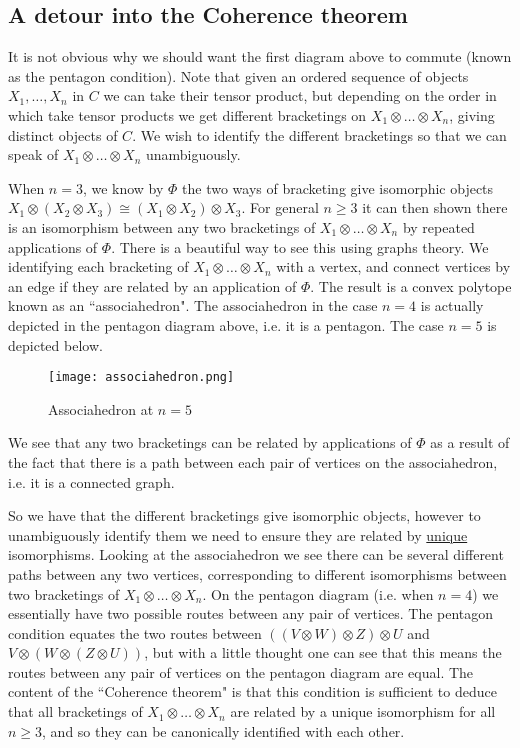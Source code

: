 \documentclass[11pt]{article}
\newcommand{\bb}{\medbreak}
\newcommand{\nt}{\noindent}
\theoremstyle{definition}
\begin{document}
\subsection{A detour into the Coherence theorem}
\nt It is not obvious why we should want the first diagram above to commute (known as the pentagon condition). Note that given an ordered sequence of objects $X_1,\dots,X_n$ in $C$ we can take their tensor product, but depending on the order in which take tensor products we get different bracketings on $X_1\otimes \dots \otimes X_n$, giving distinct objects of $C$. We wish to identify the different bracketings so that we can speak of $X_1\otimes\dots \otimes X_n$ unambiguously.\bb

\nt When $n=3$, we know by $\Phi$ the two ways of bracketing give isomorphic objects $X_1\otimes (X_2\otimes X_3)\cong (X_1\otimes X_2)\otimes X_3$. For general $n\geq 3$ it can then shown there is an isomorphism between any two bracketings of $X_1\otimes \dots \otimes X_n$ by repeated applications of $\Phi$. There is a beautiful way to see this using graphs theory. We identifying each bracketing of $X_1\otimes \dots \otimes X_n$ with a vertex, and connect vertices by an edge if they are related by an application of $\Phi$. The result is a convex polytope known as an ``associahedron". The associahedron in the case $n=4$ is actually depicted in the pentagon diagram above, i.e. it is a pentagon. The case $n=5$ is depicted below.
\begin{figure}\label{fig1}
\centering
\texttt{[image: associahedron.png]}
\caption{Associahedron at $n=5$}
\label{Unknot}
\end{figure}\bb
\nt We see that any two bracketings can be related by applications of $\Phi$ as a result of the fact that there is a path between each pair of vertices on the associahedron, i.e. it is a connected graph.\bb

\nt So we have that the different bracketings give isomorphic objects, however to unambiguously identify them we need to ensure they are related by \underline{unique} isomorphisms. Looking at the associahedron we see there can be several different paths between any two vertices, corresponding to different isomorphisms between two bracketings of $X_1\otimes \dots \otimes X_n$. On the pentagon diagram (i.e. when $n=4$) we essentially have two possible routes between any pair of vertices. The pentagon condition equates the two routes between $((V\otimes W)\otimes Z)\otimes U$ and $V\otimes (W\otimes (Z\otimes U))$, but with a little thought one can see that this means the routes between any pair of vertices on the pentagon diagram are equal. The content of the ``Coherence theorem" is that this condition is sufficient to deduce that all bracketings of $X_1\otimes \dots \otimes X_n$ are related by a unique isomorphism for all $n\geq 3$, and so they can be canonically identified with each other.
\end{document}
